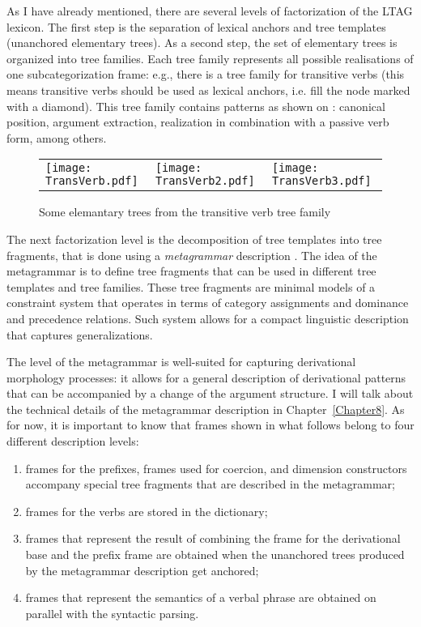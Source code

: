 
As I have already mentioned, there are several levels of factorization of the LTAG lexicon. The first step is the separation of lexical anchors and tree templates (unanchored elementary trees). As a second step, the set of elementary trees is organized into tree families. Each tree family represents all possible realisations of one subcategorization frame: e.g., there is a tree family for transitive verbs (this means transitive verbs should be used as lexical anchors, i.e. fill the node marked with a diamond). This tree family contains patterns as shown on : canonical position, argument extraction, realization in combination with a passive verb form, among others.

\begin{figure}
\begin{tabular}{l l l}
\texttt{[image: TransVerb.pdf]}
&
\texttt{[image: TransVerb2.pdf]}
&
\texttt{[image: TransVerb3.pdf]}
\end{tabular}
\caption{Some elemantary trees from the transitive verb tree family\label{fig:treefamily}}
\end{figure}

The next factorization level is the decomposition of tree templates into tree fragments, that is done using a \textit{metagrammar} description \citep{Candito:99, CrabbeDuchier:04, Crabbe:13}. The idea of the metagrammar is to define tree fragments that can be used in different tree templates and tree families. These tree fragments are minimal models of a constraint system that operates in terms of category assignments and dominance and precedence relations. Such system allows for a compact linguistic description that captures generalizations. 

The level of the metagrammar is well-suited for capturing derivational morphology processes: it allows for a general description of derivational patterns that can be accompanied by a change of the argument structure. I will talk about the technical details of the metagrammar description in Chapter~\ref{Chapter8}. As for now, it is important to know that frames shown in what follows belong to four different description levels: 
\begin{enumerate}
\item frames for the prefixes, frames used for coercion, and dimension constructors accompany special tree fragments that are described in the metagrammar; 
\item frames for the verbs are stored in the dictionary; 
\item frames that represent the result of combining the frame for the derivational base and the prefix frame are obtained when the unanchored trees produced by the metagrammar description get anchored; 
\item frames that represent the semantics of a verbal phrase are obtained on parallel with the syntactic parsing.
\end{enumerate}

